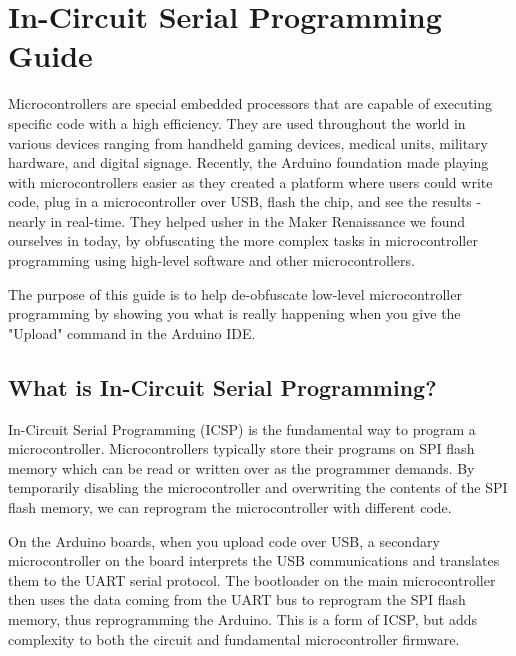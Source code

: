 %

\chapter{In-Circuit Serial Programming Guide}

Microcontrollers are special embedded processors that are capable of executing specific code with a high efficiency.
They are used throughout the world in various devices ranging from handheld gaming devices, medical units, military 
hardware, and digital signage. Recently, the Arduino foundation made playing with microcontrollers easier as they
created a platform where users could write code, plug in a microcontroller over USB, flash the chip, and see the results
- nearly in real-time. They helped usher in the Maker Renaissance we found ourselves in today, by obfuscating the more
complex tasks in microcontroller programming using high-level software and other microcontrollers.

The purpose of this guide is to help de-obfuscate low-level microcontroller programming by showing you what is really happening when you give the "Upload" command in the Arduino IDE.

\section*{What is In-Circuit Serial Programming?}

In-Circuit Serial Programming (ICSP) is the fundamental way to program a microcontroller. Microcontrollers typically
store their programs on SPI flash memory which can be read or written over as the programmer demands. By temporarily 
disabling the microcontroller and overwriting the contents of the SPI flash memory, we can reprogram the microcontroller
with different code.

On the Arduino boards, when you upload code over USB, a secondary microcontroller on the board interprets the USB
communications and translates them to the UART serial protocol. The bootloader on the main microcontroller then uses 
the data coming from the UART bus to reprogram the SPI flash memory, thus reprogramming the Arduino. This is a form of 
ICSP, but adds complexity to both the circuit and fundamental microcontroller firmware. 

